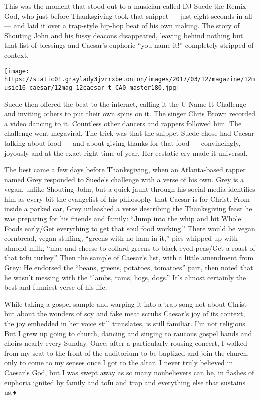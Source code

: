 This was the moment that stood out to a musician called DJ Suede the
Remix God, who just before Thanksgiving took that snippet --- just eight
seconds in all --- and
\href{https://www.youtube.com/watch?v=UR8p9z8AK0Q}{laid it over a
trap-style hip-hop} beat of his own making. The story of Shouting John
and his fussy deacons disappeared, leaving behind nothing but that list
of blessings and Caesar's euphoric ``you name it!'' completely stripped
of context.

\texttt{[image: https://static01.graylady3jvrrxbe.onion/images/2017/03/12/magazine/12music16-caesar/12mag-12caesar-t\_CA0-master180.jpg]}

Suede then offered the beat to the internet, calling it the U Name It
Challenge and inviting others to put their own spins on it. The singer
Chris Brown recorded \href{https://youtu.be/FKBnETEiRVk}{a video}
dancing to it. Countless other dancers and rappers followed him. The
challenge went megaviral. The trick was that the snippet Suede chose had
Caesar talking about food --- and about giving thanks for that food ---
convincingly, joyously and at the exact right time of year. Her ecstatic
cry made it universal.

The best came a few days before Thanksgiving, when an Atlanta-based
rapper named Grey responded to Suede's challenge with
\href{https://www.instagram.com/p/BMzFwj9jQyP/}{a verse of his own}.
Grey is a vegan, unlike Shouting John, but a quick jaunt through his
social media identifies him as every bit the evangelist of his
philosophy that Caesar is for Christ. From inside a parked car, Grey
unleashed a verse describing the Thanksgiving feast he was preparing for
his friends and family: ``Jump into the whip and hit Whole Foods
early/Get everything to get that soul food working.'' There would be
vegan cornbread, vegan stuffing, ``greens with no ham in it,'' pies
whipped up with almond milk, ``mac and cheese to collard greens to
black-eyed peas/Get a roast of that tofu turkey.'' Then the sample of
Caesar's list, with a little amendment from Grey: He endorsed the
``beans, greens, potatoes, tomatoes'' part, then noted that he wasn't
messing with the ``lambs, rams, hogs, dogs.'' It's almost certainly the
best and funniest verse of his life.

While taking a gospel sample and warping it into a trap song not about
Christ but about the wonders of soy and fake meat scrubs Caesar's joy of
its context, the joy embedded in her voice still translates, is still
familiar. I'm not religious. But I grew up going to church, dancing and
singing to raucous gospel bands and choirs nearly every Sunday. Once,
after a particularly rousing concert, I walked from my seat to the front
of the auditorium to be baptized and join the church, only to come to my
senses once I got to the altar. I never truly believed in Caesar's God,
but I was swept away as so many nonbelievers can be, in flashes of
euphoria ignited by family and tofu and trap and everything else that
sustains us.♦

